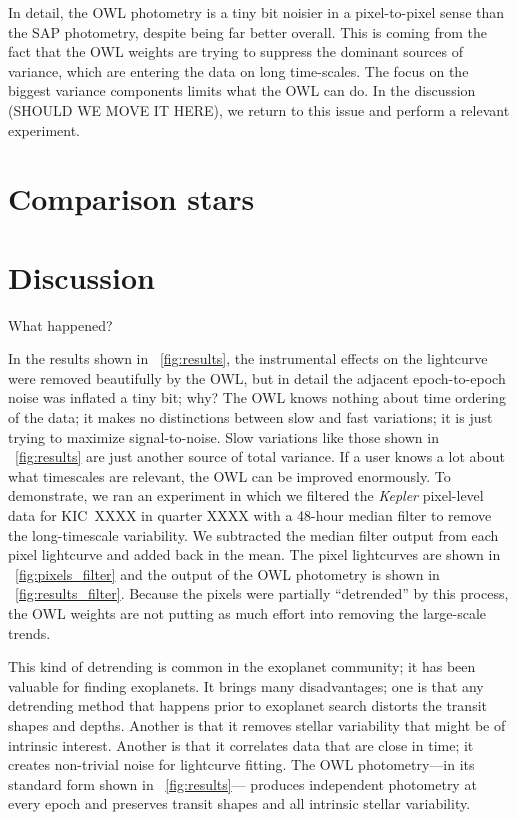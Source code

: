 \documentclass[12pt, letterpaper, preprint]{aastex}
\newcommand{\project}[1]{\textsl{#1}}
\begin{document}
In detail, the OWL photometry is a tiny bit noisier in a pixel-to-pixel sense
  than the SAP photometry,
  despite being far better overall.
This is coming from the fact that the OWL weights are trying to suppress the dominant
  sources of variance,
  which are entering the data on long time-scales.
The focus on the biggest variance components limits what the OWL can do.
In the discussion (SHOULD WE MOVE IT HERE), we return to this issue and perform a relevant experiment.

\section{Comparison stars}

\section{Discussion}

What happened?

In the results shown in \figurename~\ref{fig:results},
  the instrumental effects on the lightcurve were removed beautifully by the OWL,
  but in detail
  the adjacent epoch-to-epoch noise was inflated a tiny bit;
  why?
The OWL knows nothing about time ordering of the data;
  it makes no distinctions between slow and fast variations;
  it is just trying to maximize signal-to-noise.
Slow variations like those shown in \figurename~\ref{fig:results}
  are just another source of total variance.
If a user knows a lot about what timescales are relevant,
  the OWL can be improved enormously.
To demonstrate, we ran an experiment in which we filtered the \project{Kepler} pixel-level data
  for KIC~XXXX in quarter XXXX
  with a 48-hour median filter to remove the long-timescale variability.
We subtracted the median filter output from each pixel lightcurve and added back in the mean.
The pixel lightcurves are shown in \figurename~\ref{fig:pixels_filter}
  and the output of the OWL photometry is shown in \figurename~\ref{fig:results_filter}.
Because the pixels were partially ``detrended'' by this process,
  the OWL weights are not putting as much effort into removing the large-scale trends.

This kind of detrending is common in the exoplanet community;
  it has been valuable for finding exoplanets.
It brings many disadvantages;
  one is that any detrending method that happens prior to exoplanet search
  distorts the transit shapes and depths.
Another is that it removes stellar variability that might be of intrinsic interest.
Another is that it correlates data that are close in time;
  it creates non-trivial noise for lightcurve fitting.
The OWL photometry---in its standard form shown in \figurename~\ref{fig:results}---%
  produces independent photometry at every epoch
  and preserves transit shapes and all intrinsic stellar variability.
\end{document}
